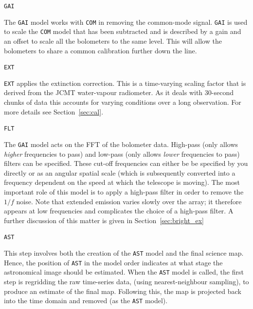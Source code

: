 \documentclass[twoside,11pt]{article}
\newcommand{\htmlref}[2]{#1}
\newcommand{\latexhtml}[2]{#1}
\renewcommand{\_}{\texttt{\symbol{95}}}
\newcommand{\cref}[3]{\latexhtml{#1~\ref{#2}}{\htmlref{#3}{#2}}}
\begin{document}
\begin{minipage}[t]{0.07\linewidth}
\texttt{GAI}
\end{minipage}
\begin{minipage}[t]{0.92\linewidth}The \texttt{GAI} model works with
\texttt{COM} in removing the common-mode signal. \texttt{GAI} is used to
scale the \texttt{COM} model that has been subtracted and is described by
a gain and an offset to scale all the bolometers to the same level. This
will allow the bolometers to share a common calibration further down the
line. \\
\end{minipage}
\begin{minipage}[t]{0.07\linewidth}
\texttt{EXT}
\end{minipage}
\begin{minipage}[t]{0.92\linewidth}\texttt{EXT} applies the extinction
correction. This is a time-varying scaling factor that is derived from
the JCMT water-vapour radiometer. As it deals with 30-second chunks of
data this accounts for varying conditions over a long observation. For
more details see \cref{Section}{sec:cal}{SCUBA-2 data calibration}. \\
\end{minipage}
\begin{minipage}[t]{0.07\linewidth}
\texttt{FLT}
\end{minipage}
\begin{minipage}[t]{0.92\linewidth}The \texttt{GAI} model acts on the FFT
of the bolometer data. High-pass (only allows \emph{higher} frequencies to
pass) and low-pass (only allows \emph{lower} frequencies to pass) filters
can be specified. These cut-off frequencies can either be be specified by
you directly or as an angular spatial scale (which is subsequently
converted into a frequency dependent on the speed at which the
telescope is moving). The most important role of this model is to
apply a high-pass filter in order to remove the $1/f$ noise. Note that
extended emission varies slowly over the array; it therefore appears
at low frequencies and complicates the choice of a high-pass filter. A
further discussion of this matter is given in
\cref{Section}{sec:bright_ex}{Extended galactic sources}\\
\end{minipage}
\begin{minipage}[t]{0.07\linewidth}
\texttt{AST}
\end{minipage}
\begin{minipage}[t]{0.92\linewidth}This step involves both the creation of the
\texttt{AST} model and the final science map. Hence, the position of
\texttt{AST} in the model order indicates at what stage the astronomical
image should be estimated. When the \texttt{AST} model is called, the first
step is regridding the raw time-series data, (using nearest-neighbour sampling),
to produce an estimate of the final map. Following this, the map is
projected back into the time domain and removed (as the \texttt{AST}
model).\\
\end{minipage}
\end{document}
